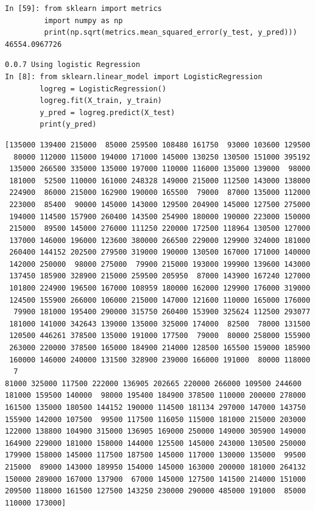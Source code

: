 \documentclass[sigconf]{acmart}
\begin{document}
\begin{lstlisting}
In [59]: from sklearn import metrics
         import numpy as np
         print(np.sqrt(metrics.mean_squared_error(y_test, y_pred)))
46554.0967726
\end{lstlisting}

\begin{lstlisting}
0.0.7 Using logistic Regression
In [8]: from sklearn.linear_model import LogisticRegression
        logreg = LogisticRegression()
        logreg.fit(X_train, y_train)
        y_pred = logreg.predict(X_test)
        print(y_pred)
\end{lstlisting}
\begin{lstlisting}
[135000 139400 215000  85000 259500 108480 161750  93000 103600 129500
  80000 112000 115000 194000 171000 145000 130250 130500 151000 395192
 135000 266500 335000 135000 197000 110000 116000 135000 139000  98000
 181000  52500 110000 161000 248328 149000 215000 112500 143000 138000
 224900  86000 215000 162900 190000 165500  79000  87000 135000 112000
 223000  85400  90000 145000 143000 129500 204900 145000 127500 275000
 194000 114500 157900 260400 143500 254900 180000 190000 223000 150000
 215000  89500 145000 276000 111250 220000 172500 118964 130500 127000
 137000 146000 196000 123600 380000 266500 229000 129900 324000 181000
 260400 144152 202500 279500 319000 190000 130500 167000 171000 140000
 142000 250000  98000 275000  79900 215000 193000 199900 139600 143000
 137450 185900 328900 215000 259500 205950  87000 143900 167240 127000
 101800 224900 196500 167000 108959 180000 162000 129900 176000 319000
 124500 155900 266000 106000 215000 147000 121600 110000 165000 176000
  79900 181000 195400 290000 315750 260400 153900 325624 112500 293077
 181000 141000 342643 139000 135000 325000 174000  82500  78000 131500
 120500 446261 378500 135000 191000 177500  79000  80000 258000 155900
 263000 220000 378500 165000 184900 214000 128500 165500 159000 185900
 160000 146000 240000 131500 328900 239000 166000 191000  80000 118000
  7
81000 325000 117500 222000 136905 202665 220000 266000 109500 244600
181000 159500 140000  98000 195400 184900 378500 110000 200000 278000
161500 135000 180500 144152 190000 114500 181134 297000 147000 143750
155900 142000 107500  99500 117500 116050 115000 181000 215000 203000
122000 138800 104900 315000 136905 169000 250000 149000 305900 149000
164900 229000 181000 158000 144000 125500 145000 243000 130500 250000
179900 158000 145000 117500 187500 145000 117000 130000 135000  99500
215000  89000 143000 189950 154000 145000 163000 200000 181000 264132
150000 289000 167000 137900  67000 145000 127500 141500 214000 151000
209500 118000 161500 127500 143250 230000 290000 485000 191000  85000
110000 173000]
\end{lstlisting}
\end{document}
